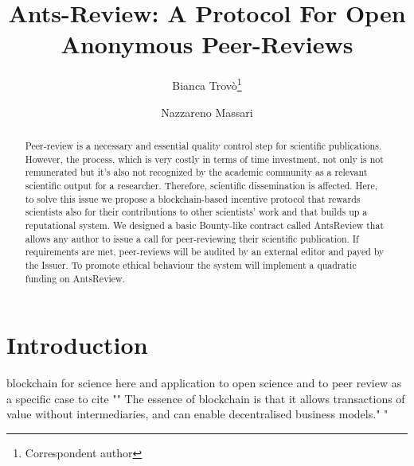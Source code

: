 \documentclass[runningheads]{llncs}
\begin{document}
%
\title{Ants-Review: A Protocol For Open Anonymous Peer-Reviews}
%
%
\author{Bianca Trovò\thanks{Correspondent author} \and
Nazzareno Massari}
%
%
%
\maketitle              %
%
\begin{abstract}
Peer-review is a necessary and essential quality control step for scientific publications. However, the process, which is very costly in terms of time investment, not only is not remunerated but it’s also not recognized by the academic community as a relevant scientific output for a researcher. Therefore, scientific dissemination is affected. Here, to solve this issue we propose a blockchain-based incentive protocol that rewards scientists also for their contributions to other scientists’ work and that builds up a reputational system. We designed a basic Bounty-like contract called AntsReview that allows any author to issue a call for peer-reviewing their scientific publication. If requirements are met, peer-reviews will be audited by an external editor and payed by the Issuer. To promote ethical behaviour the system will implement a quadratic funding on AntsReview.
\end{abstract}
%
%
\section{Introduction}
blockchain for science here and application to open science and to peer review as a specific case
to cite "" The essence of blockchain is that it allows transactions of value without intermediaries, and can enable decentralised business models." "
\end{document}
